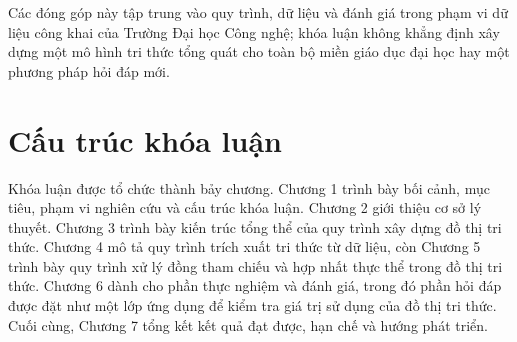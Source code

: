 Các đóng góp này tập trung vào quy trình, dữ liệu và đánh giá trong phạm vi dữ liệu công khai của Trường Đại học Công nghệ; khóa luận không khẳng định xây dựng một mô hình tri thức tổng quát cho toàn bộ miền giáo dục đại học hay một phương pháp hỏi đáp mới.

\section{Cấu trúc khóa luận}

Khóa luận được tổ chức thành bảy chương. Chương 1 trình bày bối cảnh, mục tiêu, phạm vi nghiên cứu và cấu trúc khóa luận. Chương 2 giới thiệu cơ sở lý thuyết. Chương 3 trình bày kiến trúc tổng thể của quy trình xây dựng đồ thị tri thức. Chương 4 mô tả quy trình trích xuất tri thức từ dữ liệu, còn Chương 5 trình bày quy trình xử lý đồng tham chiếu và hợp nhất thực thể trong đồ thị tri thức. Chương 6 dành cho phần thực nghiệm và đánh giá, trong đó phần hỏi đáp được đặt như một lớp ứng dụng để kiểm tra giá trị sử dụng của đồ thị tri thức. Cuối cùng, Chương 7 tổng kết kết quả đạt được, hạn chế và hướng phát triển.
